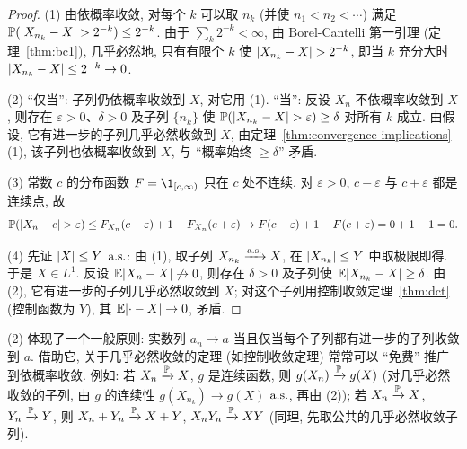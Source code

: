 \begin{proof}
(1) 由依概率收敛, 对每个 $k$ 可以取 $n_k$ (并使 $n_1<n_2<\cdots$) 满足 $\P(\abs{X_{n_k}-X}>2^{-k})\le2^{-k}$. 由于 $\sum_k2^{-k}<\infty$, 由 Borel-Cantelli 第一引理 (定理~\ref{thm:bc1}), 几乎必然地, 只有有限个 $k$ 使 $\abs{X_{n_k}-X}>2^{-k}$, 即当 $k$ 充分大时 $\abs{X_{n_k}-X}\le2^{-k}\to0$.

(2) ``仅当'': 子列仍依概率收敛到 $X$, 对它用 (1). ``当'': 反设 $X_n$ 不依概率收敛到 $X$, 则存在 $\varepsilon>0$、$\delta>0$ 及子列 $\{n_k\}$ 使 $\P(\abs{X_{n_k}-X}>\varepsilon)\ge\delta$ 对所有 $k$ 成立. 由假设, 它有进一步的子列几乎必然收敛到 $X$, 由定理~\ref{thm:convergence-implications} (1), 该子列也依概率收敛到 $X$, 与 ``概率始终 $\ge\delta$'' 矛盾.

(3) 常数 $c$ 的分布函数 $F=\1_{[c,\infty)}$ 只在 $c$ 处不连续. 对 $\varepsilon>0$, $c-\varepsilon$ 与 $c+\varepsilon$ 都是连续点, 故
\[
\P(\abs{X_n-c}>\varepsilon)\le F_{X_n}(c-\varepsilon)+1-F_{X_n}(c+\varepsilon)\to F(c-\varepsilon)+1-F(c+\varepsilon)=0+1-1=0.
\]

(4) 先证 $\abs{X}\le Y$ $\as$: 由 (1), 取子列 $X_{n_k}\xrightarrow{\as}X$, 在 $\abs{X_{n_k}}\le Y$ 中取极限即得. 于是 $X\in L^1$. 反设 $\E\abs{X_n-X}\not\to0$, 则存在 $\delta>0$ 及子列使 $\E\abs{X_{n_k}-X}\ge\delta$. 由 (2), 它有进一步的子列几乎必然收敛到 $X$; 对这个子列用控制收敛定理~\ref{thm:dct} (控制函数为 $Y$), 其 $\E\abs{\cdot-X}\to0$, 矛盾.
\end{proof}

\begin{intuition}
(2) 体现了一个一般原则: 实数列 $a_n\to a$ 当且仅当每个子列都有进一步的子列收敛到 $a$. 借助它, 关于几乎必然收敛的定理 (如控制收敛定理) 常常可以 ``免费'' 推广到依概率收敛. 例如: 若 $X_n\xrightarrow{\P}X$, $g$ 是连续函数, 则 $g(X_n)\xrightarrow{\P}g(X)$ (对几乎必然收敛的子列, 由 $g$ 的连续性 $g(X_{n_k})\to g(X)$ $\as$, 再由 (2)); 若 $X_n\xrightarrow{\P}X$, $Y_n\xrightarrow{\P}Y$, 则 $X_n+Y_n\xrightarrow{\P}X+Y$, $X_nY_n\xrightarrow{\P}XY$ (同理, 先取公共的几乎必然收敛子列).
\end{intuition}

